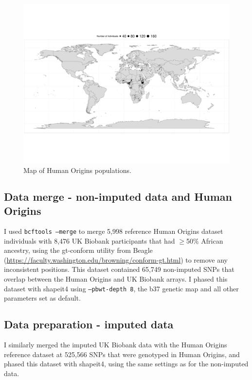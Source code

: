 \begin{figure}
	    \centering
	    \includegraphics[width=1.0\textwidth]{../images/chapter3/HumanOriginsMap.pdf}
	    \caption{Map of Human Origins populations.}
	    \label{fig:HumanOriginsMap}
\end{figure}

\subsection{Data merge - non-imputed data and Human Origins}

I used \texttt{bcftools --merge} to merge 5,998 reference Human Origins dataset individuals with 8,476 UK Biobank participants that had $\geq$50\% African ancestry, using the gt-conform utility from Beagle (\url{https://faculty.washington.edu/browning/conform-gt.html}) to remove any inconsistent positions. This dataset contained 65,749 non-imputed SNPs that overlap between the Human Origins and UK Biobank arrays. I phased this dataset with shapeit4 \cite{delaneau2018integrative} using \texttt{--pbwt-depth 8}, the b37 genetic map and all other parameters set as default.  

\subsection{Data preparation - imputed data}

I similarly merged the imputed UK Biobank data with the Human Origins reference dataset at 525,566 SNPs that were genotyped in Human Origins, and phased this dataset with shapeit4, using the same settings as for the non-imputed data.

